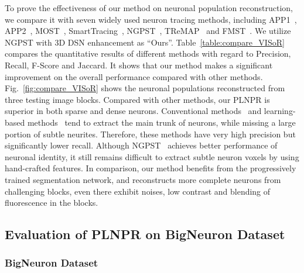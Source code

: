 To prove the effectiveness of our method on neuronal population reconstruction, we compare it with seven widely used neuron tracing methods, including APP1~\cite{Peng2011},  APP2~\cite{Xiao2013}, MOST~\cite{Wu2014}, SmartTracing~\cite{Chen2015}, NGPST~\cite{Quan2015}, TReMAP~\cite{Zhou2016} and  FMST~\cite{Yang2019}.
%
We utilize NGPST with 3D DSN enhancement as ``Ours''. 
%
Table~\ref{table:compare_VISoR} compares the quantitative results of different methods with regard to Precision, Recall, F-Score and Jaccard.
%
It shows that our method makes a significant improvement on the overall performance compared with other methods.
%
Fig.~\ref{fig:compare_VISoR} shows the neuronal populations reconstructed from three testing image blocks.
%
Compared with other methods, our PLNPR is superior in both sparse and dense neurons.
Conventional methods~\cite{Peng2011, Xiao2013, Wu2014, Zhou2016} and learning-based methods~\cite{Chen2015, Yang2019} tend to extract the main trunk of neurons, while missing a large portion of subtle neurites. 
Therefore, these methods have very high precision but significantly lower recall.
Although NGPST~\cite{Quan2015} achieves better performance of neuronal identity, it still remains difficult to extract subtle neuron voxels by using hand-crafted features.
%
In comparison, our method benefits from the progressively trained segmentation network, and reconstructs more complete neurons from challenging blocks, even there exhibit noises, low contrast and blending of fluorescence in the blocks.


\subsection{Evaluation of PLNPR on BigNeuron Dataset}
\label{sec:exp_PLNPR_BigNeuron}

\subsubsection{BigNeuron Dataset}

